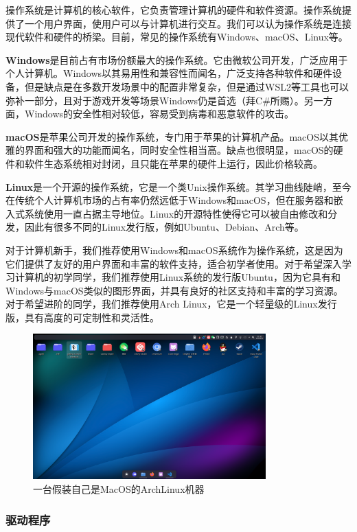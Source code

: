\documentclass[../main.tex]{subfiles}
\begin{document}
操作系统是计算机的核心软件，它负责管理计算机的硬件和软件资源。操作系统提供了一个用户界面，使用户可以与计算机进行交互。我们可以认为操作系统是连接现代软件和硬件的桥梁。目前，常见的操作系统有Windows、macOS、Linux等。

\textbf{Windows}\faWindows 是目前占有市场份额最大的操作系统。它由微软公司开发，广泛应用于个人计算机。Windows以其易用性和兼容性而闻名，广泛支持各种软件和硬件设备，但是缺点是在多数开发场景中的配置非常复杂，但是通过WSL2等工具也可以弥补一部分，且对于游戏开发等场景Windows仍是首选（拜C\#所赐）。另一方面，Windows的安全性相对较低，容易受到病毒和恶意软件的攻击。

\textbf{macOS}\faApple 是苹果公司开发的操作系统，专门用于苹果的计算机产品。macOS以其优雅的界面和强大的功能而闻名，同时安全性相当高。缺点也很明显，macOS的硬件和软件生态系统相对封闭，且只能在苹果的硬件上运行，因此价格较高。

\textbf{Linux}\faLinux 是一个开源的操作系统，它是一个类Unix操作系统。其学习曲线陡峭，至今在传统个人计算机市场的占有率仍然远低于Windows和macOS，但在服务器和嵌入式系统使用一直占据主导地位。Linux的开源特性使得它可以被自由修改和分发，因此有很多不同的Linux发行版，例如Ubuntu、Debian、Arch等。

对于计算机新手，我们推荐使用Windows和macOS系统作为操作系统，这是因为它们提供了友好的用户界面和丰富的软件支持，适合初学者使用。对于希望深入学习计算机的初学同学，我们推荐使用Linux系统的发行版Ubuntu，因为它具有和Windows与macOS类似的图形界面，并具有良好的社区支持和丰富的学习资源。对于希望进阶的同学，我们推荐使用Arch Linux，它是一个轻量级的Linux发行版，具有高度的可定制性和灵活性。

\begin{figure}[ht]
  \centering
  \includegraphics[width=0.8\textwidth]{images/fake-mac.png}
  \caption{一台假装自己是MacOS的ArchLinux机器}
\end{figure}

\subsubsection{驱动程序}
\end{document}
